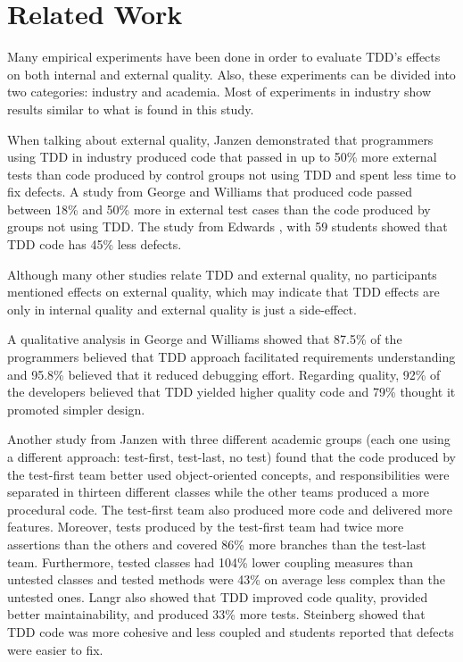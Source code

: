 \section{Related Work}
 
Many empirical experiments have been done in order to evaluate TDD's effects on
both internal and external quality. Also, these experiments can be divided
into two categories: industry and academia. Most of experiments in industry
show results similar to what is found in this study.

When talking about external quality, Janzen \cite{janzen} demonstrated that
programmers using TDD in industry produced code that passed in up to 50\% more 
external tests than code produced by control groups not using TDD and spent less
time to fix defects. A study from George and Williams \cite{george-williams}
that produced code passed between 18\% and 50\% more in external test cases than the
code produced by groups not using TDD. The study from Edwards \cite{edwards},
with 59 students showed that TDD code has 45\% less defects.

Although many other studies relate TDD and external quality, no participants 
mentioned effects on external quality, which may indicate that TDD effects are
only in internal quality and external quality is just a side-effect.

A qualitative analysis in George and Williams showed that 87.5\% of the
programmers believed that TDD approach facilitated requirements 
understanding and 95.8\% believed that it reduced debugging effort. 
Regarding quality, 92\% of the developers believed that TDD yielded higher
quality code and 79\% thought it promoted simpler design.

Another study from Janzen \cite{janzen-2} with three different academic groups 
(each one using a different approach: test-first, test-last, no test) found that
the code produced by the test-first team better used object-oriented concepts,
and responsibilities were separated in thirteen different classes while the
other teams produced a more procedural code.
The test-first team also produced more code and delivered more features.
Moreover, tests produced by the test-first team had twice more assertions than
the others and covered 86\% more branches than the test-last team. Furthermore,
tested classes had 104\% lower coupling measures than untested classes and
tested methods were 43\% on average less complex than the untested ones.
Langr also \cite{langr} showed that TDD improved code quality, provided
better maintainability, and produced 33\% more tests.
Steinberg \cite{steinberg} showed that TDD code was more cohesive and less
coupled and students reported that defects were easier to fix.

